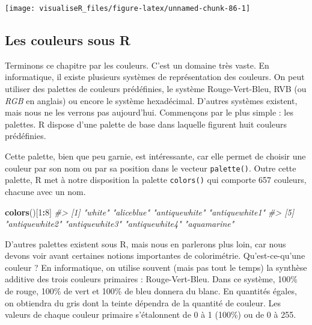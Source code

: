 \documentclass[]{article}
\newenvironment{Shaded}{\begin{snugshade}}{\end{snugshade}}
\newcommand{\CommentTok}[1]{\textcolor[rgb]{0.56,0.35,0.01}{\textit{#1}}}
\newcommand{\DecValTok}[1]{\textcolor[rgb]{0.00,0.00,0.81}{#1}}
\newcommand{\KeywordTok}[1]{\textcolor[rgb]{0.13,0.29,0.53}{\textbf{#1}}}
\newcommand{\NormalTok}[1]{#1}
\newcommand{\OperatorTok}[1]{\textcolor[rgb]{0.81,0.36,0.00}{\textbf{#1}}}
\begin{document}
\begin{center}\texttt{[image: visualiseR\_files/figure-latex/unnamed-chunk-86-1]} \end{center}

\hypertarget{les-couleurs-sous-r}{%
\subsection{Les couleurs sous R}\label{les-couleurs-sous-r}}

Terminons ce chapitre par les couleurs. C'est un domaine très vaste. En
informatique, il existe plusieurs systèmes de représentation des couleurs. On
peut utiliser des palettes de couleurs prédéfinies, le système Rouge-Vert-Bleu,
RVB (ou \emph{RGB} en anglais) ou encore le système hexadécimal. D'autres systèmes
existent, mais nous ne les verrons pas aujourd'hui. Commençons par le plus
simple : les palettes. R dispose d'une palette de base dans laquelle figurent
huit couleurs prédéfinies.

\begin{Shaded}
\end{Shaded}

Cette palette, bien que peu garnie, est intéressante, car elle permet de choisir une couleur par son nom ou par sa position dans le vecteur \texttt{palette()}. Outre cette palette, R met à notre disposition la palette \texttt{colors()} qui comporte 657 couleurs, chacune avec un nom.

\begin{Shaded}
\begin{Highlighting}[]
\KeywordTok{colors}\NormalTok{()[}\DecValTok{1}\OperatorTok{:}\DecValTok{8}\NormalTok{]}
\CommentTok{#> [1] "white"         "aliceblue"     "antiquewhite"  "antiquewhite1"}
\CommentTok{#> [5] "antiquewhite2" "antiquewhite3" "antiquewhite4" "aquamarine"}
\end{Highlighting}
\end{Shaded}

D'autres palettes existent sous R, mais nous en parlerons plus loin, car nous
devons voir avant certaines notions importantes de colorimétrie.
Qu'est-ce-qu'une couleur ? En informatique, on utilise souvent (mais pas tout le
temps) la synthèse additive des trois couleurs primaires : Rouge-Vert-Bleu. Dans
ce système, 100\% de rouge, 100\% de vert et 100\% de bleu donnera du blanc. En
quantités égales, on obtiendra du gris dont la teinte dépendra de la quantité de
couleur. Les valeurs de chaque couleur primaire s'étalonnent de 0 à 1 (100\%) ou
de 0 à 255.
\end{document}
